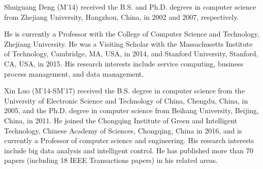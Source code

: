 \documentclass[journal]{IEEEtran}
\begin{document}
\begin{IEEEbiography}{Shuiguang Deng}
(M'14) received the B.S. and Ph.D. degrees in computer science from Zhejiang University, Hangzhou, China, in 2002 and 2007, respectively.

He is currently a Professor with the College of Computer Science and Technology, Zhejiang University. He was a Visiting Scholar with the Massachusetts Institute of Technology, Cambridge, MA, USA, in 2014, and Stanford University, Stanford, CA, USA, in 2015. His research interests include service computing, business process management, and data management.
\end{IEEEbiography}


\begin{IEEEbiography}{Xin Luo}
(M'14-SM'17) received the B.S. degree in computer science from the University of Electronic
Science and Technology of China, Chengdu, China, in 2005, and the Ph.D. degree in computer science from Beihang University, Beijing, China, in 2011. He joined the Chongqing Institute of Green and Intelligent Technology, Chinese Academy of Sciences, Chongqing, China in 2016, and is currently a Professor of computer science and engineering. His research interests include big data analysis and intelligent control. He has published more than 70 papers (including 18 IEEE Transactions papers) in his related areas.
\end{IEEEbiography}
\end{document}
